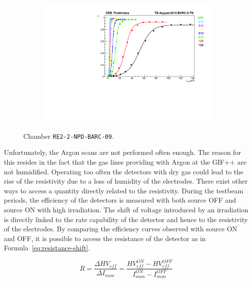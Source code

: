 \begin{figure}
\begin{subfigure}{\linewidth}
        	\caption{\label{fig:august-sig:B}}
    	\end{subfigure}
    	\begin{subfigure}{\linewidth}
			\centering
    		\includegraphics[width = \linewidth]{fig/chapt5/Imon-Graph-BARC-9-TN.pdf}
        	\caption{\label{fig:august-sig:C}}
    	\end{subfigure}
		\caption{\label{fig:august-sig} Chamber \texttt{RE2-2-NPD-BARC-09}.}
	\end{figure}
	
	Unfortunately, the Argon scans are not performed often enough. The reason for this resides in the fact that the gas lines providing with Argon at the GIF++ are not humidified. Operating too often the detectors with dry gas could lead to the rise of the resistivity due to a loss of humidity of the electrodes. There exist other ways to access a quantity directly related to the resistivity. During the testbeam periods, the efficiency of the detectors is measured with both source OFF and source ON with high irradiation. The shift of voltage introduced by an irradiation is directly linked to the rate capability of the detector and hence to the resistivity of the electrodes. By comparing the efficiency curves observed with source ON and OFF, it is possible to access the resistance of the detector as in Formula~\ref{eq:resistance-shift}.
	
	\begin{equation}
	\label{eq:resistance-shift}
	R = \frac{\Delta HV_{eff}}{\Delta I_{mon}} = \frac{HV_{eff}^{ON} - HV_{eff}^{OFF}}{I_{mon}^{ON} - I_{mon}^{OFF}}
	\end{equation}
	
